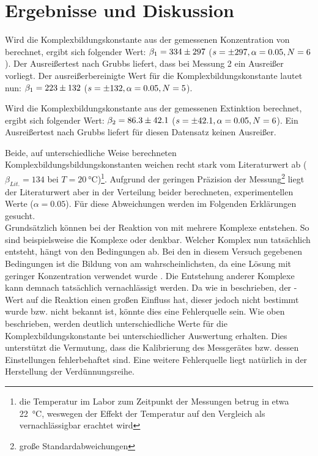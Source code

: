 \documentclass{article}
\begin{document}
  \pagebreak
  
  \section{Ergebnisse und Diskussion}
    
    Wird die Komplexbildungskonstante aus der gemessenen Konzentration von \ch{[Fe(OH2)5SCN]\pch[2]} berechnet, ergibt sich folgender Wert: $\beta_{1} = \num[separate-uncertainty]{334 \pm 297}$ ($s=\num{\pm 297},\alpha=0.05,N=6$). Der Ausreißertest nach Grubbs liefert, dass bei Messung 2 ein Ausreißer vorliegt. Der ausreißerbereinigte Wert für die Komplexbildungskonstante lautet nun: $\beta_{1} = \num[separate-uncertainty]{223 \pm 132}$ ($s=\num{\pm 132},\alpha=0.05,N=5$). 
    
    Wird die Komplexbildungskonstante aus der gemessenen Extinktion berechnet, ergibt sich folgender Wert: $\beta_{2} = \num[separate-uncertainty]{86.3 \pm 42.1}$ ($s=\num{\pm 42.1},\alpha=0.05,N=6$). Ein Ausreißertest nach Grubbs liefert für diesen Datensatz keinen Ausreißer.
    
    Beide, auf unterschiedliche Weise berechneten Komplexbildungsbildungskonstanten weichen recht stark vom Literaturwert ab ($\beta_{Lit.} = 134$ bei $T=\SI[mode=text]{20}{\degreeCelsius}$)\footnote{die Temperatur im Labor zum Zeitpunkt der Messungen betrug in etwa \SI[mode=text]{22}{\degreeCelsius}, weswegen der Effekt der Temperatur auf den Vergleich als vernachlässigbar erachtet wird}. Aufgrund der geringen Präzision der Messung\footnote{große Standardabweichungen} liegt der Literaturwert aber in der Verteilung beider berechneten, experimentellen Werte ($\alpha=0.05$). Für diese Abweichungen werden im Folgenden Erklärungen gesucht.\\
    
    Grundsätzlich können bei der Reaktion von  mit  mehrere Komplexe entstehen. So sind beispielsweise die Komplexe \ch{[Fe(OH2)4SCN2]\pch} oder \ch{[Fe(OH2)3SCN3]} denkbar. Welcher Komplex nun tatsächlich entsteht, hängt von den Bedingungen ab. Bei den in diesem Versuch gegebenen Bedingungen ist  die Bildung von \ch{[Fe(OH2)5SCN]\pch[2]} am wahrscheinlichsten, da eine  Lösung mit geringer Konzentration verwendet wurde \cite[S. 125]{Wasseranalyse}. Die Entstehung anderer Komplexe kann demnach tatsächlich vernachlässigt werden. Da wie in \cite[S. 125]{Wasseranalyse} beschrieben, der \pH-Wert auf die Reaktion einen großen Einfluss hat, dieser jedoch nicht bestimmt wurde bzw. nicht bekannt ist, könnte dies eine Fehlerquelle sein. Wie oben beschrieben, werden deutlich unterschiedliche Werte für die Komplexbildungskonstante bei unterschiedlicher Auswertung erhalten. Dies unterstützt die Vermutung, dass die Kalibrierung des Messgerätes bzw. dessen Einstellungen fehlerbehaftet sind. Eine weitere Fehlerquelle liegt natürlich in der Herstellung der Verdünnungsreihe. \\
    
\end{document}
